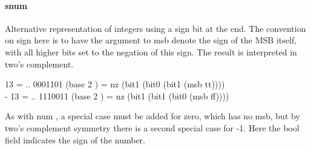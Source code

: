 \documentclass{article}
\begin{document}
\paragraph{snum}
\par
Alternative representation of integers using a sign bit at the end.
The convention on sign here is to have the argument to 
\colorbox[RGB]{253,246,227}{{{{\color[RGB]{101, 123, 131} msb }}}} denote
the sign of the MSB itself, with all higher bits set to the negation
of this sign. The result is interpreted in two's complement.
\\
\colorbox[RGB]{253,246,227}{\parbox{4.5in}{{{{\color[RGB]{108, 113, 196} 13 }}}{{{\color[RGB]{101, 123, 131}    }}}{{{\color[RGB]{181, 137, 0} = }}}{{{\color[RGB]{101, 123, 131}  .. }}}{{{\color[RGB]{108, 113, 196} 0001101 }}}{{{\color[RGB]{101, 123, 131} (base  }}}{{{\color[RGB]{108, 113, 196} 2 }}}{{{\color[RGB]{101, 123, 131} )  }}}{{{\color[RGB]{181, 137, 0} = }}}{{{\color[RGB]{101, 123, 131}  nz (bit1 (bit0 (bit1 (msb tt))))
 }}}\\

{{{\color[RGB]{181, 137, 0} - }}}{{{\color[RGB]{108, 113, 196} 13 }}}{{{\color[RGB]{101, 123, 131}   }}}{{{\color[RGB]{181, 137, 0} = }}}{{{\color[RGB]{101, 123, 131}  .. }}}{{{\color[RGB]{108, 113, 196} 1110011 }}}{{{\color[RGB]{101, 123, 131} (base  }}}{{{\color[RGB]{108, 113, 196} 2 }}}{{{\color[RGB]{101, 123, 131} )  }}}{{{\color[RGB]{181, 137, 0} = }}}{{{\color[RGB]{101, 123, 131}  nz (bit1 (bit1 (bit0 (msb ff))))
 }}}\\

}}\par
As with 
\colorbox[RGB]{253,246,227}{{{{\color[RGB]{101, 123, 131} num }}}}, a special case must be added for zero, which has no msb,
but by two's complement symmetry there is a second special case for -1.
Here the 
\colorbox[RGB]{253,246,227}{{{{\color[RGB]{101, 123, 131} bool }}}} field indicates the sign of the number.
\\
\end{document}
